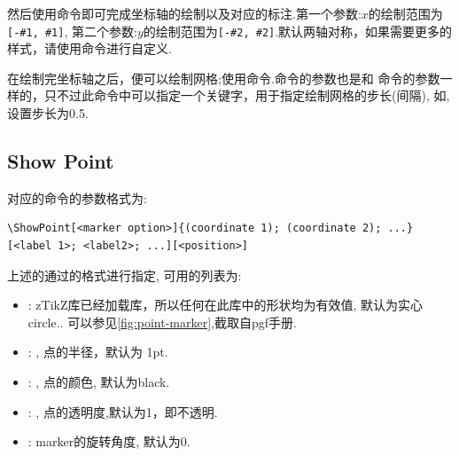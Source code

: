 然后使用命令\cmd{\ShowXYAxis}即可完成坐标轴的绘制以及对应的标注.第一个参数:$x$的绘制范围为\texttt{[-\#1, \#1]},
第二个参数:$y$的绘制范围为\texttt{[-\#2, \#2]}.默认两轴对称，如果需要更多的样式，请使用\cmd{\ShowAxis}命令进行自定义.

在绘制完坐标轴之后，便可以绘制网格;使用\cmd{\ShowGrid}命令.\cmd{\ShowGrid}\index{\cmd{\ShowGrid}}命令的参数也是和\cmd{\ShowAxis}
命令的参数一样的，只不过此命令中可以指定一个关键字，用于指定绘制网格的步长(间隔), 如,设置步长为0.5.

\subsection{Show Point}
对应的\cmd{\ShowPoint}\index{\cmd{\ShowPoint}}命令的参数格式为:

\begin{verbatim}
\ShowPoint[<marker option>]{(coordinate 1); (coordinate 2); ...}[<label 1>; <label2>; ...][<position>]
\end{verbatim}

上述的通过的格式进行指定, 可用的列表为:

\begin{itemize}
    \item {}: zTikZ库已经加载库，所以任何在此库中的形状均为有效值, 
        默认为实心circle.. 可以参见\cref{fig:point-marker},截取自pgf手册.
    \item {}: , 点的半径，默认为 1pt.
    \item {}: , 点的颜色, 默认为black.
    \item {}: , 点的透明度,默认为1，即不透明.
    \item {}: marker的旋转角度, 默认为0.
\end{itemize}

